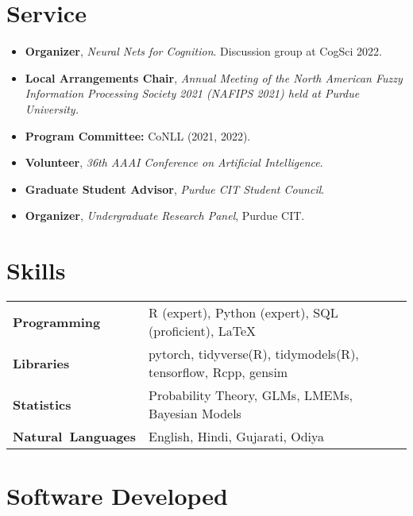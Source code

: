 \documentclass[11pt]{article}
\begin{document}
\section*{Service}
\begin{itemize}
    \item \textbf{Organizer}, \textit{Neural Nets for Cognition}. Discussion group at CogSci 2022.
    \item \textbf{Local Arrangements Chair}, \textit{Annual Meeting of the North American Fuzzy Information Processing Society 2021 (NAFIPS 2021) held at Purdue University.}
    \item \textbf{Program Committee:} CoNLL (2021, 2022).
    \item  \textbf{Volunteer}, \textit{36th AAAI Conference on Artificial Intelligence}.
    \item \textbf{Graduate Student Advisor}, \textit{Purdue CIT Student Council}.
    \item \textbf{Organizer}, \textit{Undergraduate Research Panel}, Purdue CIT.
\end{itemize}

\renewcommand*{\arraystretch}{1}
\section*{Skills}
\vspace{-1em}
\begin{longtable}{p{}  p{} }
    \textbf{Programming} & R (expert), Python (expert), SQL (proficient), \LaTeX\\
    \textbf{Libraries} & pytorch, tidyverse(R), tidymodels(R), tensorflow, Rcpp, gensim\\
    \textbf{Statistics} & Probability Theory, GLMs, LMEMs, Bayesian Models\\
    \textbf{Natural~Languages} & English, Hindi, Gujarati, Odiya
    \end{longtable}
\section*{Software Developed}
\end{document}
